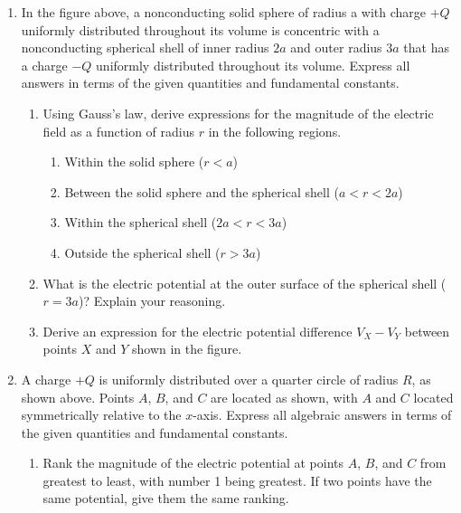 \documentclass{../../../oss-apphys}
\begin{document}
\newpage


\genfreedirections

\begin{center}
\end{center}
\begin{enumerate}[leftmargin=15pt]
\item In the figure above, a nonconducting solid sphere of radius a with charge
  $+Q$ uniformly distributed throughout its volume is concentric with a
  nonconducting spherical shell of inner radius $2a$ and outer radius $3a$ that
  has a charge $-Q$ uniformly distributed throughout its volume. Express all
  answers in terms of the given quantities and fundamental constants.
  \begin{enumerate}[leftmargin=15pt]
  \item Using Gauss's law, derive expressions for the magnitude of the
    electric field as a function of radius $r$ in the following regions.
    \begin{enumerate}[leftmargin=15pt]
    \item Within the solid sphere ($r<a$)
    \item Between the solid sphere and the spherical shell ($a<r<2a$)
    \item Within the spherical shell ($2a<r<3a$)
    \item Outside the spherical shell ($r>3a$)
    \end{enumerate}
  \item What is the electric potential at the outer surface of the spherical
    shell ($r=3a$)? Explain your reasoning.
  \item Derive an expression for the electric potential difference $V_X-V_Y$
    between points $X$ and $Y$ shown in the figure.
  \end{enumerate}
  \newpage

  \begin{center}
  \end{center}
\item A charge $+Q$ is uniformly distributed over a quarter circle of radius
  $R$, as shown above. Points $A$, $B$, and $C$ are located as shown, with $A$
  and $C$ located symmetrically relative to the $x$-axis. Express all algebraic
  answers in terms of the given quantities and fundamental constants.
  \begin{enumerate}[leftmargin=15pt]
  \item Rank the magnitude of the electric potential at points $A$, $B$, and $C$
    from greatest to least, with number 1 being greatest. If two points have
    the same potential, give them the same ranking.


\end{enumerate}
\end{enumerate}
\end{document}
